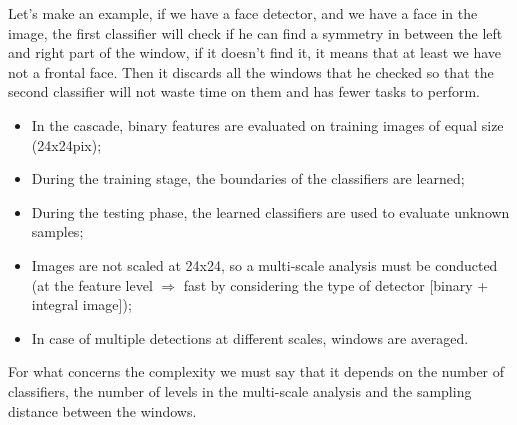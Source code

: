 Let's make an example, if we have a face detector, and we have a face in the image, the first classifier will check if he can find a symmetry in between the left and right part of the window, if it doesn't find it, it means that at least we have not a frontal face. Then it discards all the windows that he checked so that the second classifier will not waste time on them and has fewer tasks to perform.
\begin{itemize}
    \item In the cascade, binary features are evaluated on training images of equal size (24x24pix);
    \item During the training stage, the boundaries of the classifiers are learned;
    \item During the testing phase, the learned classifiers are used to evaluate unknown samples;
    \item Images are not scaled at 24x24, so a multi-scale analysis must be conducted (at the feature level $\Rightarrow$ fast by considering the type of detector [binary + integral image]);
    \item In case of multiple detections at different scales, windows are averaged.
\end{itemize}
For what concerns the complexity we must say that it depends on the number of classifiers, the number of levels in the multi-scale analysis and the sampling distance between the windows.
